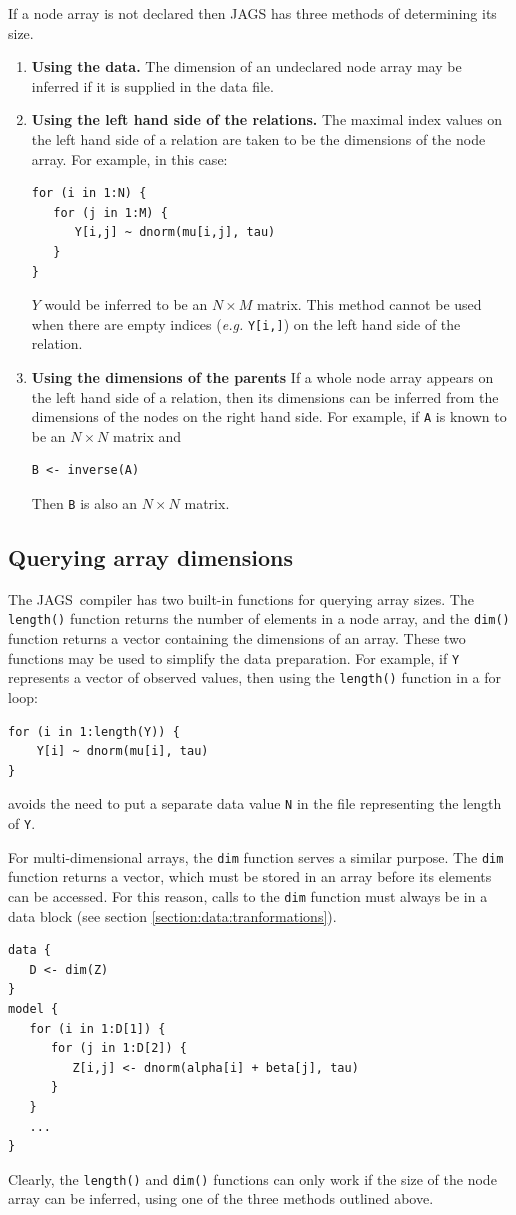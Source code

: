 \documentclass[11pt, a4paper, titlepage]{report}
\newcommand{\JAGS}{\textsf{JAGS}}
\begin{document}
If a node array is not declared then JAGS has three methods of
determining its size.
\begin{enumerate}
\item {\bf Using the data.}  The dimension of an undeclared node array
  may be inferred if it is supplied in the data file.
\item {\bf Using the left hand side of the relations.}  The maximal
  index values on the left hand side of a relation are taken to be the
  dimensions of the node array.  For example, in this case:
\begin{verbatim}
for (i in 1:N) {
   for (j in 1:M) {
      Y[i,j] ~ dnorm(mu[i,j], tau)
   }
}
\end{verbatim}
$Y$ would be inferred to be an $N \times M$ matrix. This method cannot 
be used when there are empty indices ({\em e.g.} \verb+Y[i,]+) on the left
hand side of the relation.
\item {\bf Using the dimensions of the parents} If a whole node array
  appears on the left hand side of a relation, then its dimensions can
  be inferred from the dimensions of the nodes on the right hand side.
  For example, if \verb+A+ is known to be an $N \times N$ matrix
  and
\begin{verbatim}
B <- inverse(A)
\end{verbatim}
Then \verb+B+ is also an $N \times N$ matrix.
\end{enumerate}

\subsection{Querying array dimensions}  

The \JAGS\ compiler has two built-in functions for querying array
sizes.  The \verb+length()+ function returns the number of elements in
a node array, and the \verb+dim()+ function returns a vector
containing the dimensions of an array.  These two functions may be
used to simplify the data preparation. For example, if \verb+Y+
represents a vector of observed values, then using the \verb+length()+
function in a for loop:
\begin{verbatim}
for (i in 1:length(Y)) {
    Y[i] ~ dnorm(mu[i], tau)
}
\end{verbatim}
avoids the need to put a separate data value \verb+N+ in the file
representing the length of \verb+Y+.  

For multi-dimensional arrays, the \verb+dim+ function serves a similar
purpose. The \verb+dim+ function returns a vector, which must be stored
in an array before its elements can be accessed. For this reason, calls
to the \verb+dim+ function must always be in a data block (see section
\ref{section:data:tranformations}).
\begin{verbatim}
data {
   D <- dim(Z)
}
model {
   for (i in 1:D[1]) {
      for (j in 1:D[2]) {
         Z[i,j] <- dnorm(alpha[i] + beta[j], tau)
      }
   }
   ...
}
\end{verbatim}
Clearly, the \verb+length()+ and \verb+dim()+ functions can only
work if the size of the node array can be inferred, using one of the
three methods outlined above.
\end{document}
